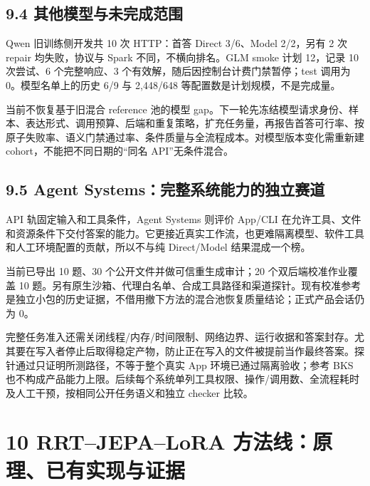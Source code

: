 \documentclass[UTF8,10pt,a4paper,fontset=fandol]{ctexart}
\begin{document}
\subsection*{9.4 其他模型与未完成范围}


Qwen 旧训练侧开发共 10 次 HTTP：首答 Direct 3/\allowbreak{}6、Model 2/\allowbreak{}2，另有 2 次 repair 均失败，协议与 Spark 不同，不横向排名。GLM smoke 计划 12，记录 10 次尝试、6 个完整响应、3 个有效解，随后因控制台计费门禁暂停；test 调用为 0。模型名单上的历史 6/\allowbreak{}9 与 2,448/\allowbreak{}648 等配置数是计划规模，不是完成量。


当前不恢复基于旧混合 reference 池的模型 gap。下一轮先冻结模型请求身份、样本、表达形式、调用预算、后端和重复策略，扩充任务量，再报告首答可行率、按原子失败率、语义门禁通过率、条件质量与全流程成本。对模型版本变化需重新建 cohort，不能把不同日期的“同名 API”无条件混合。


\subsection*{9.5 Agent Systems：完整系统能力的独立赛道}


API 轨固定输入和工具条件，Agent Systems 则评价 App/\allowbreak{}CLI 在允许工具、文件和资源条件下交付答案的能力。它更接近真实工作流，也更难隔离模型、软件工具和人工环境配置的贡献，所以不与纯 Direct/\allowbreak{}Model 结果混成一个榜。


当前已导出 10 题、30 个公开文件并做可信重生成审计；20 个双后端校准作业覆盖 10 题。另有原生沙箱、代理白名单、合成工具路径和渠道探针。现有校准参考是独立小包的历史证据，不借用撤下方法的混合池恢复质量结论；正式产品会话仍为 0。


完整任务准入还需关闭线程/\allowbreak{}内存/\allowbreak{}时间限制、网络边界、运行收据和答案封存。尤其要在写入者停止后取得稳定产物，防止正在写入的文件被提前当作最终答案。探针通过只证明所测路径，不等于整个真实 App 环境已通过隔离验收；参考 BKS 也不构成产品能力上限。后续每个系统单列工具权限、操作/\allowbreak{}调用数、全流程耗时及人工干预，按相同公开任务语义和独立 checker 比较。


\section*{10 RRT–JEPA–LoRA 方法线：原理、已有实现与证据}
\end{document}
